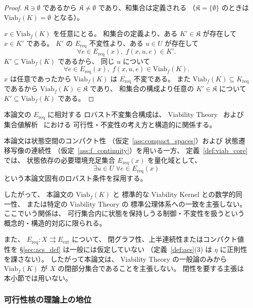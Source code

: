 \begin{proof}
$\mathfrak{K}\ni\emptyset$ であるから
$\mathfrak{K}\neq\emptyset$ であり、和集合は定義される
（$\mathfrak{K}=\{\emptyset\}$ のときは
$\mathrm{Viab}_f(K)=\emptyset$ となる）。

$x\in\mathrm{Viab}_f(K)$ を任意にとる。
和集合の定義より、ある $K'\in\mathfrak{K}$ が存在して
$x\in K'$ である。
$K'$ の $E_{\mathrm{req}}$ 不変性より、ある $u\in U$ が存在して
\[
  \forall e\in E_{\mathrm{req}}(x),\;
  f(x,u,e)\in K'.
\]
$K'\subseteq\mathrm{Viab}_f(K)$ であるから、
同じ $u$ について
\[
  \forall e\in E_{\mathrm{req}}(x),\;
  f(x,u,e)\in\mathrm{Viab}_f(K).
\]
$x$ は任意であったから $\mathrm{Viab}_f(K)$ は
$E_{\mathrm{req}}$ 不変である。
また $\mathrm{Viab}_f(K)\subseteq K_{\mathrm{req}}$ であるから
$\mathrm{Viab}_f(K)\in\mathfrak{K}$ であり、
和集合の構成より任意の $K'\in\mathfrak{K}$ について
$K'\subseteq\mathrm{Viab}_f(K)$ である。
\end{proof}

\begin{remark}
\label{rem:viability_relation}
本論文の $E_{\mathrm{req}}$ に相対する
ロバスト不変集合構成は、
Viability Theory~\cite{Aubin1991,SaintPierre1994} および
集合値解析~\cite{AubinFrankowska1990} における
可行性・不変性の考え方と構造的に関係する。

本論文は状態空間のコンパクト性
（仮定~\ref{ass:compact_spaces}）および
状態遷移写像の連続性
（仮定~\ref{ass:f_continuity}）を用いる一方、
定義~\ref{def:viab_core} では、
状態依存の必要環境充足集合
$E_{\mathrm{req}}(x)$ を量化域として、
\[
  \exists u\in U\;
  \forall e\in E_{\mathrm{req}}(x)
\]
という本論文固有のロバスト条件を採用する。

したがって、
本論文の $\mathrm{Viab}_f(K)$ と
標準的な Viability Kernel との数学的同一性、
または特定の Viability Theory の
標準公理体系への一致を主張しない。
ここでいう関係は、
可行集合内に状態を保持しうる制御・不変性を扱うという
概念的・構造的対応に限られる。

また、
$E_{\mathrm{req}}:X\rightrightarrows E_{\mathrm{ext}}$ について、
閉グラフ性、上半連続性またはコンパクト値性を
\S\ref{sec:acs_def} は一般には仮定していない
（定義~\ref{def:acs}(3) は $\eta$ に正則性を課さない）。
したがって本論文は、
Viability Theory の一般論のみから
$\mathrm{Viab}_f(K)$ が $X$ の閉部分集合であることを主張しない。
閉性を要する主張は本小節では用いない。
\end{remark}

\subsubsection{可行性核の理論上の地位}

